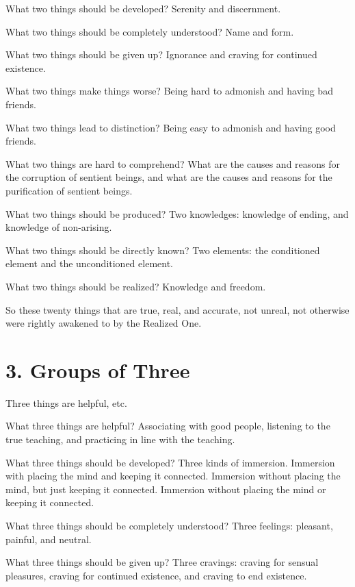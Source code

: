 \documentclass[12pt,openany]{book}%
\begin{document}
What two things should be developed? Serenity and discernment. 

What two things should be completely understood? Name and form. 

What two things should be given up? Ignorance and craving for continued existence. 

What two things make things worse? Being hard to admonish and having bad friends. 

What two things lead to distinction? Being easy to admonish and having good friends. 

What two things are hard to comprehend? What are the causes and reasons for the corruption of sentient beings, and what are the causes and reasons for the purification of sentient beings. 

What two things should be produced? Two knowledges: knowledge of ending, and knowledge of non-arising. 

What two things should be directly known? Two elements: the conditioned element and the unconditioned element. 

What two things should be realized? Knowledge and freedom. 

So these twenty things that are true, real, and accurate, not unreal, not otherwise were rightly awakened to by the Realized One. 

\section*{3. Groups of Three }

Three things are helpful, etc. 

What three things are helpful? Associating with good people, listening to the true teaching, and practicing in line with the teaching. 

What three things should be developed? Three kinds of immersion. Immersion with placing the mind and keeping it connected. Immersion without placing the mind, but just keeping it connected. Immersion without placing the mind or keeping it connected. 

What three things should be completely understood? Three feelings: pleasant, painful, and neutral. 

What three things should be given up? Three cravings: craving for sensual pleasures, craving for continued existence, and craving to end existence. 
\end{document}
